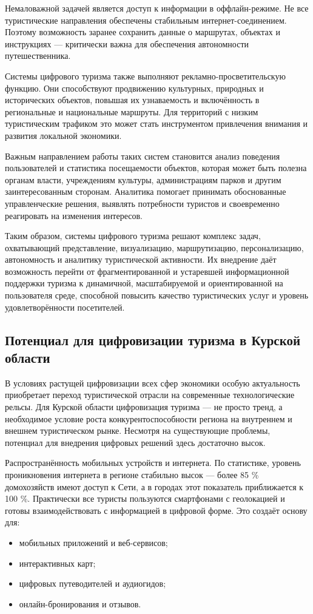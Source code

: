 Немаловажной задачей является доступ к информации в оффлайн-режиме. Не все туристические направления обеспечены стабильным интернет-соединением. Поэтому возможность заранее сохранить данные о маршрутах, объектах и инструкциях — критически важна для обеспечения автономности путешественника.

Системы цифрового туризма также выполняют рекламно-просветительскую функцию. Они способствуют продвижению культурных, природных и исторических объектов, повышая их узнаваемость и включённость в региональные и национальные маршруты. Для территорий с низким туристическим трафиком это может стать инструментом привлечения внимания и развития локальной экономики.

Важным направлением работы таких систем становится анализ поведения пользователей и статистика посещаемости объектов, которая может быть полезна органам власти, учреждениям культуры, администрациям парков и другим заинтересованным сторонам. Аналитика помогает принимать обоснованные управленческие решения, выявлять потребности туристов и своевременно реагировать на изменения интересов.

Таким образом, системы цифрового туризма решают комплекс задач, охватывающий представление, визуализацию, маршрутизацию, персонализацию, автономность и аналитику туристической активности. Их внедрение даёт возможность перейти от фрагментированной и устаревшей информационной поддержки туризма к динамичной, масштабируемой и ориентированной на пользователя среде, способной повысить качество туристических услуг и уровень удовлетворённости посетителей.

\subsection{Потенциал для цифровизации туризма в Курской области}

В условиях растущей цифровизации\cite{b2} всех сфер экономики особую актуальность приобретает переход туристической отрасли на современные технологические рельсы. Для Курской области цифровизация туризма — не просто тренд, а необходимое условие роста конкурентоспособности региона на внутреннем и внешнем туристическом рынке. Несмотря на существующие проблемы, потенциал для внедрения цифровых решений здесь достаточно высок.

Распространённость мобильных устройств и интернета.
По статистике, уровень проникновения интернета в регионе стабильно высок — более 85 \% домохозяйств имеют доступ к Сети, а в городах этот показатель приближается к 100 \%. Практически все туристы пользуются смартфонами с геолокацией и готовы взаимодействовать с информацией в цифровой форме. Это создаёт основу для:
\begin{itemize}
	\item мобильных приложений и веб-сервисов;
	\item интерактивных карт;
	\item цифровых путеводителей и аудиогидов;
	\item онлайн-бронирования и отзывов.
\end{itemize}

